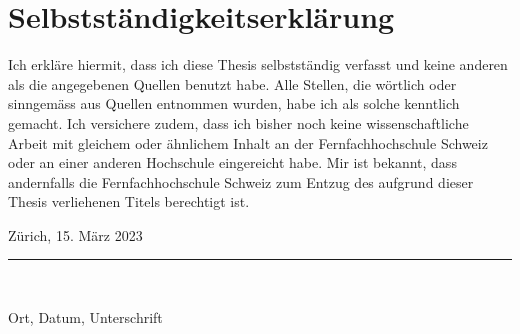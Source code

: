 \listoffigures

\listoftables

\listoftheorems[title={Definitionsverzeichnis}]

\listoflistings




\chapter*{Selbstständigkeitserklärung}
Ich erkläre hiermit, dass ich diese Thesis selbstständig verfasst
und keine anderen als die angegebenen Quellen benutzt habe.
Alle Stellen, die wörtlich oder sinngemäss aus Quellen entnommen wurden,
habe ich als solche kenntlich gemacht. Ich versichere zudem, dass ich bisher
noch keine wissenschaftliche Arbeit mit gleichem oder ähnlichem Inhalt an der
Fernfachhochschule Schweiz oder an einer anderen Hochschule eingereicht habe.
Mir ist bekannt, dass andernfalls die Fernfachhochschule Schweiz zum Entzug
des aufgrund dieser Thesis verliehenen Titels berechtigt ist.

\vspace{4cm}
\noindent
Zürich, 15. März 2023
\hrule \ \\[-0.5ex]

\vspace*{-3.2cm}\hspace*{4cm}

\unskip
\vspace{2cm}
Ort, Datum, Unterschrift
